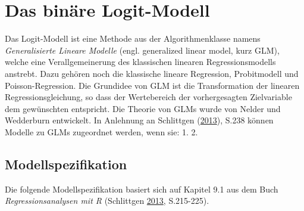 \documentclass[12pt,]{article}
\begin{document}
\section{Das binäre Logit-Modell}\label{das-binare-logit-modell}

Das Logit-Modell ist eine Methode aus der Algorithmenklasse namens
\emph{Generalisierte Lineare Modelle} (engl. generalized linear model,
kurz GLM), welche eine Verallgemeinerung des klassischen linearen
Regressionsmodells anstrebt. Dazu gehören noch die klassische lineare
Regression, Probitmodell und Poisson-Regression. Die Grundidee von GLM
ist die Transformation der linearen Regressionsgleichung, so dass der
Wertebereich der vorhergesagten Zielvariable dem gewünschten entspricht.
Die Theorie von GLMs wurde von Nelder und Wedderburn entwickelt. In
Anlehnung an Schlittgen
(\protect\hyperlink{ref-schlittgen2013regressionsanalysen}{2013}), S.238
können Modelle zu GLMs zugeordnet werden, wenn sie: 1. 2.

\newpage 

\subsection{Modellspezifikation}\label{modellspezifikation}

Die folgende Modellspezifikation basiert sich auf Kapitel 9.1 aus dem
Buch \emph{Regressionsanalysen mit R} (Schlittgen
\protect\hyperlink{ref-schlittgen2013regressionsanalysen}{2013},
S.215-225).
\end{document}
